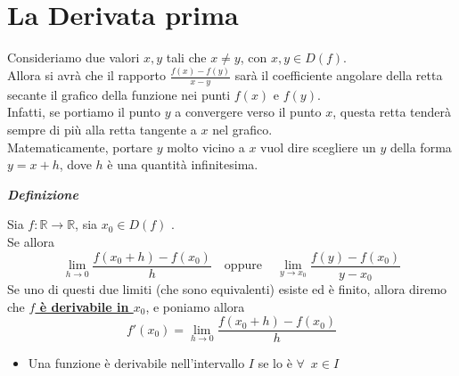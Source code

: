 \documentclass{article}
\theoremstyle{definition}
\begin{document}
\section{La Derivata prima}
Consideriamo due valori $x,y$ tali che $x \neq y$, con $x,y \in D(f)$.
\\
Allora si avrà che il rapporto $\frac{f(x)-f(y)}{x-y}$ sarà il coefficiente angolare della retta secante il grafico della funzione nei punti $f(x)$ e $f(y)$.
\\
Infatti, se portiamo il punto $y$ a convergere verso il punto $x$, questa retta tenderà sempre di più alla retta tangente a $x$ nel grafico.
\\
Matematicamente, portare $y$ molto vicino a $x$ vuol dire scegliere un $y$ della forma $y=x+h$, dove $h$ è una quantità infinitesima.
\\
\begin{center}
    \textbf{\textit{Definizione}}
\end{center}
Sia $f: \mathbb{R} \to \mathbb{R}$, sia $x_0 \in D(f)$
.
\\
Se allora
\begin{equation*}
    \lim_{h \to 0}\frac{f(x_0+h)-f(x_0)}{h} \,\,\,\,\,\, \mbox{oppure} \,\,\,\,\,\,\, \lim_{y \to x_0}\frac{f(y)-f(x_0)}{y-x_0}
\end{equation*}
Se uno di questi due limiti (che sono equivalenti) esiste ed è finito, allora diremo che \underline{\textbf{$f$ è derivabile in $x_0$}}, e poniamo allora
\begin{equation*}
    f'(x_0)=\lim_{h \to 0}\frac{f(x_0+h)-f(x_0)}{h}
\end{equation*}
\begin{itemize}
    \item Una funzione è derivabile nell'intervallo $I$ se lo è $\forall \,\,\, x \in I$
\end{itemize}
\end{document}
